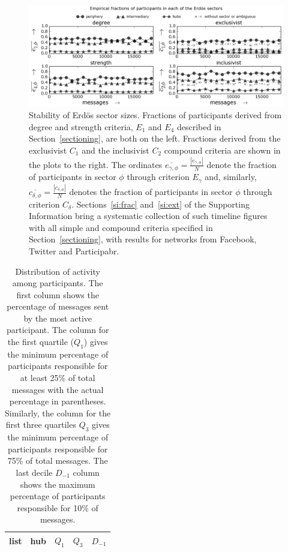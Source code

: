 \documentclass[%
aip,
jmp,%
amsmath,amssymb,
reprint,%
]{revtex4-1}
\begin{document}
\begin{figure} 
\centering
\includegraphics[width=\textwidth]{figs/InText-WLAU-S1000__}
\caption{Stability of Erd\"os sector sizes.
Fractions of participants derived from degree and strength criteria, $E_1$ and $E_4$ described in Section~\ref{sectioning}, are both on the left.
Fractions derived from the exclusivist $C_1$ and the inclusivist $C_2$ compound criteria are shown in the plots to the right.
The ordinates $\overline{e_{\gamma,\phi}}=\frac{|e_{\gamma,\phi}|}{N}$ denote the fraction of participants in sector $\phi$ through criterion $E_\gamma$
and, similarly, $\overline{c_{\delta,\phi}}=\frac{|c_{\delta,\phi}|}{N}$ denotes the fraction of participants in sector $\phi$ through criterion $C_\delta$.
Sections~\ref*{si:frac} and~\ref*{si:ext} of the Supporting Information bring a systematic collection of such timeline figures with all simple and compound criteria specified in Section~\ref{sectioning}, with results for networks from Facebook, Twitter and Participabr.}
\label{fig:sectIL}
\end{figure}


\begin{table}[h]
\caption{Distribution of activity among participants.
The first column shows the percentage of messages sent by the most active participant. The column for the first quartile ($Q_1$) gives the minimum percentage of participants responsible for at least 25\% of total messages with the actual percentage in parentheses. Similarly, the column for the first three quartiles $Q_3$ gives the minimum percentage of participants responsible for 75\% of total messages.
The last decile $D_{-1}$ column shows the maximum percentage of participants responsible for 10\% of messages.}
\begin{center}
\begin{tabular}{ | l ||  c | c | c | c | }
\hline
list & hub & $ Q_1 $ & $ Q_3 $ & $D_{-1}$ \\ \hline

\end{tabular}
\end{center}
\label{autores}
\end{table}
\end{document}
